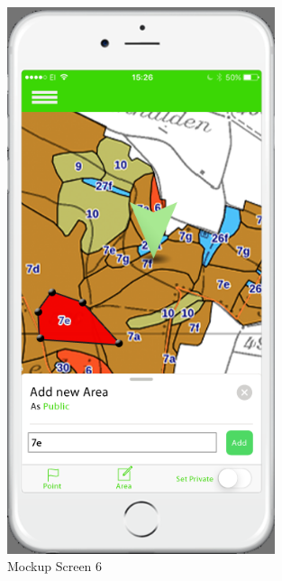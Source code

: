 \begin{figure}[H]
\centering
    \includegraphics[width=0.7\textwidth]{mockup1-6}
    \caption{Mockup Screen 6}
    \label{fig:mesh6}
\end{figure}

